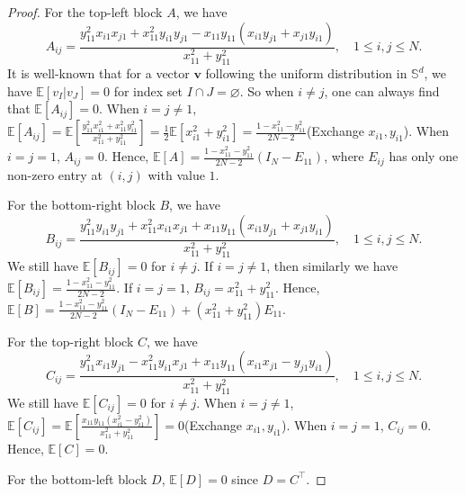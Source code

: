 \documentclass{amsart}
\theoremstyle{plain}
\theoremstyle{definition}
\theoremstyle{remark}
\newcommand{\EE}{\mathbb{E}}
\begin{document}
\begin{proof}
    For the top-left block $A$, we have 
    \[A_{ij}=\frac{y_{11}^2x_{i1}x_{j1}+x_{11}^2y_{i1}y_{j1}-x_{11}y_{11}(x_{i1}y_{j1}+x_{j1}y_{i1})}{x_{11}^2+y_{11}^2},\quad 1\leq i,j\leq N.\]
    It is well-known that for a vector $\bm{v}$ following the uniform distribution in $\mathbb S^d$, we have $\EE[v_I|v_{J}]=0$ for index set $I\cap J=\varnothing$. So when $i\neq j$, one can always find that $\EE[A_{ij}]=0$. When $i=j\neq1$, $\EE[A_{ij}]=\EE\left[\frac{y_{11}^2x_{i1}^2+x_{11}^2y_{i1}^2}{x_{11}^2+y_{11}^2}\right]=\frac{1}{2}\EE[x_{i1}^2+y_{i1}^2]=\frac{1-x_{11}^2-y_{11}^2}{2N-2}$(Exchange $x_{i1},y_{i1}$). When $i=j=1$, $A_{ij}=0$. Hence, $\EE[A]=\frac{1-x_{11}^2-y_{11}^2}{2N-2}(I_N-E_{11})$, where $E_{ij}$ has only one non-zero entry at $(i,j)$ with value $1$.

    For the bottom-right block $B$, we have
    \[B_{ij}=\frac{y_{11}^2y_{i1}y_{j1}+x_{11}^2x_{i1}x_{j1}+x_{11}y_{11}(x_{i1}y_{j1}+x_{j1}y_{i1})}{x_{11}^2+y_{11}^2},\quad 1\leq i,j\leq N.\]
    We still have $\EE[B_{ij}]=0$ for $i\neq j$. If $i=j\neq 1$, then similarly we have $\EE[B_{ij}]=\frac{1-x_{11}^2-y_{11}^2}{2N-2}$. If $i=j=1$, $B_{ij}=x_{11}^2+y_{11}^2$. Hence, $\EE[B]=\frac{1-x_{11}^2-y_{11}^2}{2N-2}(I_N-E_{11})+(x_{11}^2+y_{11}^2)E_{11}$.

    For the top-right block $C$, we have
    \[C_{ij}=\frac{y_{11}^2x_{i1}y_{j1}-x_{11}^2y_{i1}x_{j1}+x_{11}y_{11}(x_{i1}x_{j1}-y_{j1}y_{i1})}{x_{11}^2+y_{11}^2},\quad 1\leq i,j\leq N.\]
    We still have $\EE[C_{ij}]=0$ for $i\neq j$. When $i=j\neq1$, $\EE[C_{ij}]=\EE\left[\frac{x_{11}y_{11}(x_{i1}^2-y_{i1}^2)}{x_{11}^2+y_{11}^2}\right]=0$(Exchange $x_{i1},y_{i1}$). When $i=j=1$, $C_{ij}=0$. Hence, $\EE[C]=0$. 
    
    For the bottom-left block $D$, $\EE[D]=0$ since $D=C^\top$.
    

\end{proof}
\end{document}
